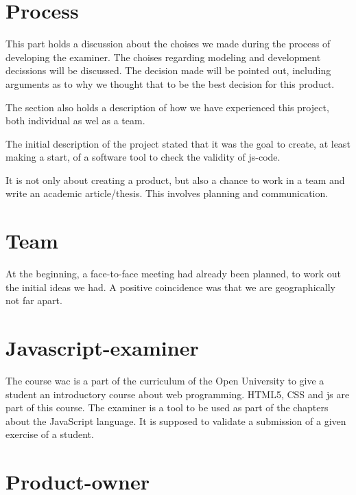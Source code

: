 \section{Process}
This part holds a discussion about the choises we made
during the process of developing the \gls{examiner}.
The choises regarding modeling and development decissions will be discussed.
The decision made will be pointed out,
including arguments as to why we thought
that to be the best decision for this product.

The section also holds a description of how we have experienced this project,
both individual as wel as a team.



The initial description of the project stated that it was the goal to create,
at least making a start, of a software tool to check the validity
of \gls{js-code}.

It is not only about creating a product, but also a chance to work in a team and write an academic article/thesis.
This involves planning and communication.


\section{Team}
At the beginning, a face-to-face meeting had already been planned, to work out the initial ideas we had.
A positive coincidence was that we are geographically not far apart.


\section{Javascript-examiner}
The course \gls{wac} is a part of the curriculum of the Open University to give
a student an introductory course about web programming.
HTML5, CSS and \gls{js} are part of this course.
The \gls{examiner} is a tool to be used as part of the chapters about the JavaScript language.
It is supposed to validate a submission of a given exercise of a student.

\section{Product-owner}

